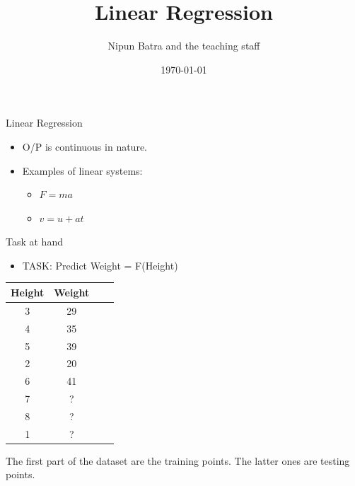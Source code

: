 \documentclass{beamer}
\title{Linear Regression}
\date{\today}
\author{Nipun Batra and the teaching staff}
\institute{IIT Gandhinagar}
\begin{document}
  \maketitle
  
  
  

\begin{frame}{Linear Regression}
\begin{itemize}
	
	
	\item<+-> O/P is continuous in nature.
	\item<+-> Examples of linear systems:
	\begin{itemize}
		\item<+-> $F=ma$
		\item<+-> $v=u+at$
	\end{itemize}
	
\end{itemize}
\end{frame}

\begin{frame}{Task at hand}
\begin{itemize}

\item TASK: Predict Weight = F(Height)
\end{itemize}
\begin{center}
    

\begin{tabular}{ |c|c|c|c| } 
\hline
 Height & Weight \\
\hline
3 & 29 \\ 
4 & 35 \\ 
5 & 39\\
2 & 20\\
6 & 41\\
\hline
\hline
7 & ?\\
8 & ?\\
1 &? \\
\hline
\end{tabular}

\end{center}
The first part of the dataset are the training points. The latter ones are testing points.	

\end{frame}
\end{document}
